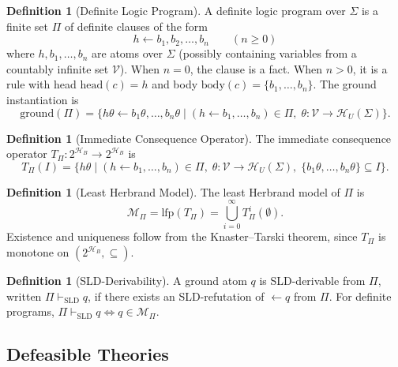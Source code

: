 \documentclass{article}
\theoremstyle{definition}
\newtheorem{definition}[theorem]{Definition}
\newcommand{\HB}{\mathcal{H}_B}
\newcommand{\HU}{\mathcal{H}_U}
\newcommand{\head}{\mathrm{head}}
\newcommand{\pSLD}{\vdash_{\mathrm{SLD}}}
\begin{document}
\begin{definition}[Definite Logic Program]\label{def:deflp}
A definite logic program over $\Sigma$ is a finite set $\Pi$ of definite clauses of the form
\[
    h \leftarrow b_1, b_2, \ldots, b_n \qquad (n \geq 0)
\]
where $h, b_1, \ldots, b_n$ are atoms over $\Sigma$ (possibly containing variables from a countably infinite set $\mathcal{V}$). When $n = 0$, the clause is a fact. When $n > 0$, it is a rule with head $\head(c) = h$ and body $\mathrm{body}(c) = \{b_1, \ldots, b_n\}$. The ground instantiation is
\[
    \mathrm{ground}(\Pi) = \{h\theta \leftarrow b_1\theta, \ldots, b_n\theta \mid (h \leftarrow b_1, \ldots, b_n) \in \Pi,\; \theta: \mathcal{V} \to \HU(\Sigma)\}.
\]
\end{definition}

\begin{definition}[Immediate Consequence Operator]\label{def:tp}
The immediate consequence operator $T_\Pi : 2^{\HB} \to 2^{\HB}$ is
\[
    T_\Pi(I) = \bigl\{h\theta \mid (h \leftarrow b_1, \ldots, b_n) \in \Pi,\; \theta: \mathcal{V} \to \HU(\Sigma),\; \{b_1\theta, \ldots, b_n\theta\} \subseteq I\bigr\}.
\]
\end{definition}

\begin{definition}[Least Herbrand Model]\label{def:lhm}
The least Herbrand model of $\Pi$ is
\[
    \mathcal{M}_\Pi = \mathrm{lfp}(T_\Pi) = \bigcup_{i=0}^{\infty} T_\Pi^i(\emptyset).
\]
Existence and uniqueness follow from the Knaster--Tarski theorem, since $T_\Pi$ is monotone on $(2^{\HB}, \subseteq)$.
\end{definition}

\begin{definition}[SLD-Derivability]\label{def:sld}
A ground atom $q$ is SLD-derivable from $\Pi$, written $\Pi \pSLD q$, if there exists an SLD-refutation of $\leftarrow q$ from $\Pi$. For definite programs, $\Pi \pSLD q \iff q \in \mathcal{M}_\Pi$.
\end{definition}


\subsection{Defeasible Theories}
\end{document}
